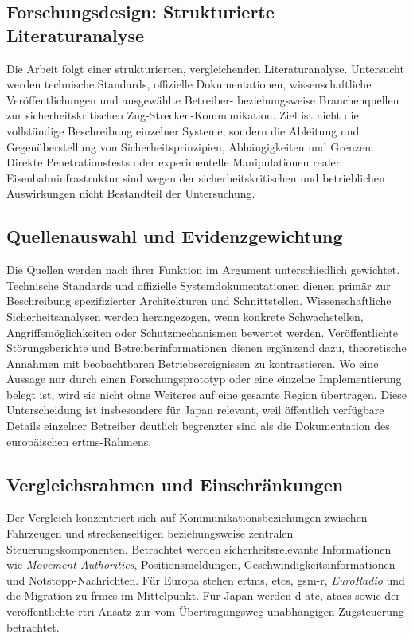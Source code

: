 \documentclass[runningheads]{res/llncs}
\begin{document}
\subsection{Forschungsdesign: Strukturierte Literaturanalyse}
\label{sec:Forschungsdesign_Strukturierte_Literaturanalyse}

Die Arbeit folgt einer strukturierten, vergleichenden Literaturanalyse. Untersucht werden technische Standards, offizielle Dokumentationen, wissenschaftliche Veröffentlichungen und ausgewählte Betreiber- beziehungsweise Branchenquellen zur sicherheitskritischen Zug-Strecken-Kommunikation. Ziel ist nicht die vollständige Beschreibung einzelner Systeme, sondern die Ableitung und Gegenüberstellung von Sicherheitsprinzipien, Abhängigkeiten und Grenzen. Direkte Penetrationstests oder experimentelle Manipulationen realer Eisenbahninfrastruktur sind wegen der sicherheitskritischen und betrieblichen Auswirkungen nicht Bestandteil der Untersuchung.

\subsection{Quellenauswahl und Evidenzgewichtung}
\label{sec:Quellenauswahl_und_Evidenzgewichtung}

Die Quellen werden nach ihrer Funktion im Argument unterschiedlich gewichtet. Technische Standards und offizielle Systemdokumentationen dienen primär zur Beschreibung spezifizierter Architekturen und Schnittstellen. Wissenschaftliche Sicherheitsanalysen werden herangezogen, wenn konkrete Schwachstellen, Angriffsmöglichkeiten oder Schutzmechanismen bewertet werden. Veröffentlichte Störungsberichte und Betreiberinformationen dienen ergänzend dazu, theoretische Annahmen mit beobachtbaren Betriebsereignissen zu kontrastieren. Wo eine Aussage nur durch einen Forschungsprototyp oder eine einzelne Implementierung belegt ist, wird sie nicht ohne Weiteres auf eine gesamte Region übertragen. Diese Unterscheidung ist insbesondere für Japan relevant, weil öffentlich verfügbare Details einzelner Betreiber deutlich begrenzter sind als die Dokumentation des europäischen \gls{ertms}-Rahmens.

\subsection{Vergleichsrahmen und Einschränkungen}
\label{sec:Vergleichsrahmen_und_Einschränkungen}

Der Vergleich konzentriert sich auf Kommunikationsbeziehungen zwischen Fahrzeugen und streckenseitigen beziehungsweise zentralen Steuerungskomponenten. Betrachtet werden sicherheitsrelevante Informationen wie \textit{Movement Authorities}, Positionsmeldungen, Geschwindigkeitsinformationen und Notstopp-Nachrichten. Für Europa stehen \gls{ertms}, \gls{etcs}, \gls{gsm-r}, \textit{EuroRadio} und die Migration zu \gls{frmcs} im Mittelpunkt. Für Japan werden \gls{d-atc}, \gls{atacs} sowie der veröffentlichte \gls{rtri}-Ansatz zur vom Übertragungsweg unabhängigen Zugsteuerung betrachtet.
\end{document}
